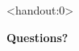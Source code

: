 \begin{frame}<handout:0>
  \begin{center}
    \Huge{\textbf{Questions?}}
  \end{center}
\end{frame}

\begin{frame}

\begin{block}{\exercise}

\end{block}

\end{frame}


